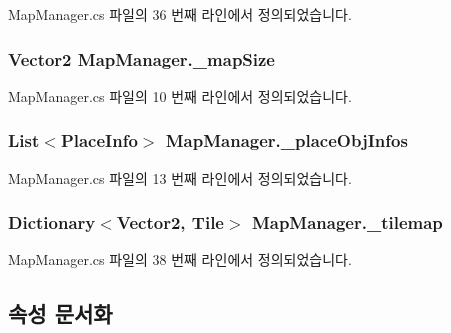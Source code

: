 Map\+Manager.\+cs 파일의 36 번째 라인에서 정의되었습니다.

\subsubsection[{\texorpdfstring{\+\_\+map\+Size}{_mapSize}}]{\setlength{\rightskip}{0pt plus 5cm}Vector2 Map\+Manager.\+\_\+map\+Size\hspace{0.3cm}{\ttfamily [private]}}\hypertarget{class_map_manager_a960f398cc92f569f620ddc8c0140a5c7}{}\label{class_map_manager_a960f398cc92f569f620ddc8c0140a5c7}


Map\+Manager.\+cs 파일의 10 번째 라인에서 정의되었습니다.

\subsubsection[{\texorpdfstring{\+\_\+place\+Obj\+Infos}{_placeObjInfos}}]{\setlength{\rightskip}{0pt plus 5cm}List$<${\bf Place\+Info}$>$ Map\+Manager.\+\_\+place\+Obj\+Infos\hspace{0.3cm}{\ttfamily [private]}}\hypertarget{class_map_manager_ab581d2c754246f74999a0b744ba2b14f}{}\label{class_map_manager_ab581d2c754246f74999a0b744ba2b14f}


Map\+Manager.\+cs 파일의 13 번째 라인에서 정의되었습니다.

\subsubsection[{\texorpdfstring{\+\_\+tilemap}{_tilemap}}]{\setlength{\rightskip}{0pt plus 5cm}Dictionary$<$Vector2, {\bf Tile}$>$ Map\+Manager.\+\_\+tilemap\hspace{0.3cm}{\ttfamily [private]}}\hypertarget{class_map_manager_a58f7635d8e19795f3845a3f85e2b4ac3}{}\label{class_map_manager_a58f7635d8e19795f3845a3f85e2b4ac3}


Map\+Manager.\+cs 파일의 38 번째 라인에서 정의되었습니다.



\subsection{속성 문서화}
